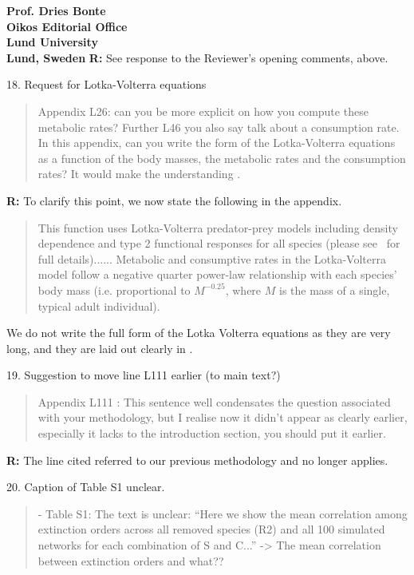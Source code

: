 \documentclass[12pt]{letter}
\begin{document}
\begin{letter}{\bf Prof. Dries Bonte\\
Oikos Editorial Office \\
Lund University \\
Lund, Sweden}
      \textbf{R:} See response to the Reviewer's opening comments, above. %


    18. Request for Lotka-Volterra equations

    \begin{quotation}
      Appendix L26: can you be more explicit on how you compute these metabolic rates? Further L46 you also say talk about a consumption rate. In this appendix, can you write the form of the Lotka-Volterra equations as a function of the body masses, the metabolic rates and the consumption rates? It would make the understanding .
      \end{quotation}

      \textbf{R:}
      To clarify this point, we now state the following in the appendix.
      
      \begin{quotation}
      This function uses Lotka-Volterra predator-prey models including density dependence and type 2 functional responses for all species (please see~\citet{Delmas2017} for full details)...... Metabolic and consumptive rates in the Lotka-Volterra model follow a negative quarter power-law relationship with each species' body mass (i.e. proportional to $M^{-0.25}$, where $M$ is the mass of a single, typical adult individual). 
      \end{quotation}
      
      We do not write the full form of the Lotka Volterra equations as they are very long, and they are laid out clearly in \citep{Delmas2017}.
      

    19. Suggestion to move line L111 earlier (to main text?) 
    
    \begin{quotation}
      Appendix L111 : This sentence well condensates the question associated with your methodology, but I realise now it didn’t appear as clearly earlier, especially it lacks to the introduction section, you should put it earlier.
      \end{quotation}


      \textbf{R:} The line cited referred to our previous methodology and no longer applies.


    20. Caption of Table S1 unclear.

    \begin{quotation}
      - Table S1: The text is unclear: ``Here we show the mean correlation among
      extinction orders across all removed species (R2) and all 100 simulated networks for each combination of S and C...'' -> The mean correlation between extinction orders and what??
      \end{quotation}



\end{letter}
\end{document}
